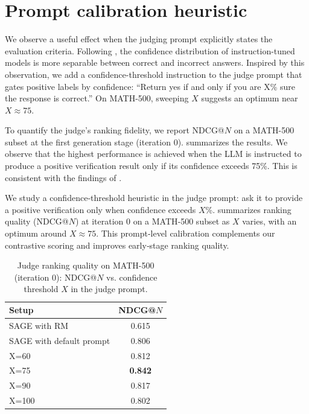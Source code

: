 \documentclass[11pt]{article}
\theoremstyle{plain}
\theoremstyle{definition}
\theoremstyle{remark}
\begin{document}
\section{Prompt calibration heuristic}
\label{sec:app-prompt-calibration}
{
\noindent We observe a useful effect when the judging prompt explicitly states the evaluation criteria. Following \citet{kalai2025language}, the confidence distribution of instruction-tuned models is more separable between correct and incorrect answers. Inspired by this observation, we add a confidence-threshold instruction to the judge prompt that gates positive labels by confidence: ``Return yes if and only if you are X\% sure the response is correct.'' On MATH-500, sweeping \(X\) suggests an optimum near \(X\approx 75\).

To quantify the judge's ranking fidelity, we report NDCG@\(N\) on a MATH-500 subset at the first generation stage (iteration 0).  summarizes the results. We observe that the highest performance is achieved when the LLM is instructed to produce a positive verification result only if its confidence exceeds 75\%. This is consistent with the findings of \citet{kalai2025language}.
}

\noindent We study a confidence‑threshold heuristic in the judge prompt: ask it to provide a positive verification only when confidence exceeds \(X\)\%.  summarizes ranking quality (NDCG@\(N\)) at iteration 0 on a MATH‑500 subset as \(X\) varies, with an optimum around \(X\!\approx\!75\). This prompt‑level calibration complements our contrastive scoring and improves early‑stage ranking quality.
\begin{table}[t]
\centering
\begin{small}
\begin{sc}
\begin{tabular}{lc}
\toprule
\textbf{Setup} & \textbf{NDCG@$N$} \\
\midrule
SAGE with RM & 0.615 \\
SAGE with default prompt & 0.806 \\
X=60 & 0.812 \\
X=75 & \textbf{0.842} \\
X=90 & 0.817 \\
X=100 & 0.802 \\
\bottomrule
\end{tabular}
\end{sc}
\end{small}
\caption{Judge ranking quality on MATH-500 (iteration 0): NDCG@\(N\) vs. confidence threshold \(X\) in the judge prompt.}
\label{tab:judge-threshold-ndcg}
\end{table}
\end{document}
